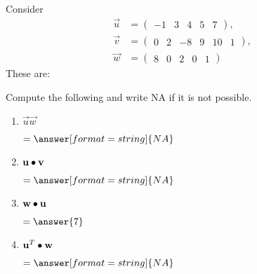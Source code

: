 \documentclass{ximera}
\author{Parisa Fatheddin}
\begin{document}
\begin{exercise}

Consider
\begin{align*}
  \vec{u} &= \begin{pmatrix} -1 & 3 & 4 & 5 & 7
  \end{pmatrix},\\
  \vec{v} &= \begin{pmatrix}
0 & 2 & -8 & 9 & 10 & 1
  \end{pmatrix},\\
  \vec{w} &= \begin{pmatrix}
8 & 0 & 2 & 0 & 1
\end{pmatrix}
\end{align*}
These are:
  \begin{multipleChoice}
    \pdfOnly{\end{multicols}}
  \end{multipleChoice}
  Compute the following and write NA if it is not possible.
  \begin{enumerate}
  \item $\vec{u}\vec{w}$ \begin{prompt} $= \answer[format=string]{NA}$\end{prompt}
  \item $\mathbf{u} \bullet \mathbf{v}$ \begin{prompt} $= \answer[format=string]{NA}$\end{prompt}
  \item $\mathbf{w} \bullet \mathbf{u}$ \begin{prompt} $= \answer{7}$\end{prompt}
  \item $\mathbf{u}^{T} \bullet \mathbf{w}$ \begin{prompt} $= \answer[format=string]{NA}$\end{prompt}
      \pdfOnly{\end{multicols}}
      \end{enumerate}
\end{exercise}
\end{document}
